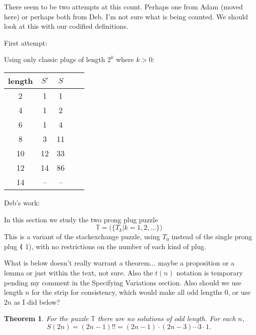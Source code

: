 \documentclass[10pt]{article}
\newtheorem{theorem}{Theorem}
\numberwithin{equation}{section}
\newenvironment{anote}
               {{\textcolor{blue}{Note:}}
                 \itshape
               }
               {}
\newcommand{\plug}[1]{%
\mbox{{\textbf\texttt #1}}
}
\newcommand{\puzzle}[1]{%
   \ensuremath{
   \mathbb{#1}
   }
}
\begin{document}
\begin{anote}
There seem to be two attempts at this count. Perhaps one from Adam (moved here) or perhaps both from Deb. I'm not sure what is being counted. We should look at this with our codified definitions.

First attempt:
\end{anote}

   Using only classic plugs of length $2^k$ where $k>0$:
        \begin{center}
        \begin{tabular}{ |c|c|c|c|c| } 
         \hline
         length & $S'$ & $S$ \\ 
         \hline
        2 & 1 & 1\\
        4 & 1 & 2\\
        6 & 1 & 4\\
        8 & 3 & 11\\
        10 & 12 & 33\\
        12 & 14 & 86\\
        14 & -- & --\\
         \hline
        \end{tabular}
        \end{center}
        
\begin{anote}
Deb's work:
\end{anote}

In this section we study the two prong plug puzzle
\begin{equation*}
    \mathbb{T} = \puzzle(\{T_k | k = 1, 2, \ldots\})
\end{equation*}
This is a variant of the stackexchange puzzle, using $T_0$ instead of the single prong plug \plug(1), with no restrictions on the number of each kind of plug.

\begin{anote}
What is below doesn't really warrant a theorem... maybe a proposition or a lemma or just within the text, not sure. Also the $t(n)$ notation is temporary pending my comment in the Specifying Variations section. Also should we use length $n$ for the strip for consistency, which would make all odd lengths 0, or use $2n$ as I did below?
\end{anote}

\begin{theorem}
For the puzzle $\mathbb{T}$ there are no solutions of odd length. For each $n$,
\begin{equation*}
    S(2n)= (2n-1)!! = (2n-1) \cdot (2n-3) \cdots 3 \cdot 1.
\end{equation*}
\end{theorem}
\end{document}
